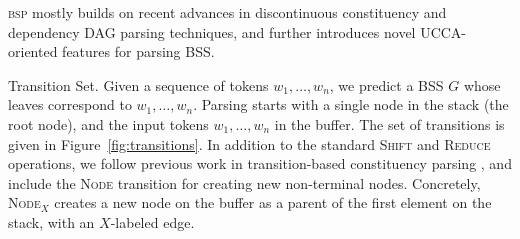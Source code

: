 \documentclass[11pt]{article}
\makeatletter
\newcommand{\figref}[1]{Figure~\ref{#1}}
\renewcommand{\paragraph}{
  \@startsection{paragraph}{4}
  {\z@}{.5ex \@plus .5ex \@minus .2ex}{-1em}
  {\normalfont\normalsize\bfseries}
}
\makeatother
\begin{document}
\textsc{bsp} mostly builds on recent advances in discontinuous constituency
and dependency DAG parsing techniques, and further introduces novel UCCA-oriented features for parsing BSS.

\paragraph{Transition Set.}
Given a sequence of tokens $w_1, \ldots, w_n$, we predict a BSS $G$ whose leaves
correspond to  $w_1, \ldots, w_n$.
Parsing starts with a single node in the stack (the root node), and the input tokens
$w_1, \ldots, w_n$ in the buffer. The set of transitions is given in \figref{fig:transitions}.
In addition to the standard \textsc{Shift} and \textsc{Reduce} operations, 
we follow previous work in transition-based constituency parsing \cite{sagae2005classifier}, and include the \textsc{Node} transition for creating new non-terminal nodes.
Concretely, \textsc{Node$_X$} creates a new node on the buffer as a parent of the first element on the stack, with an $X$-labeled edge.
\end{document}
